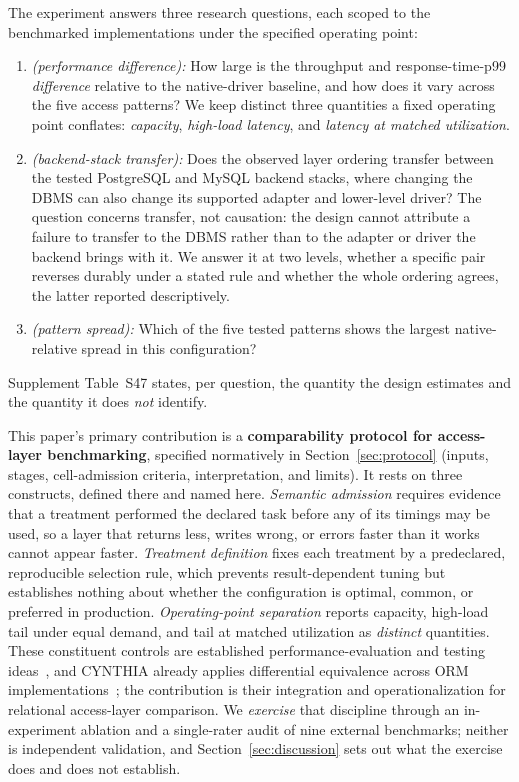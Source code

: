 The experiment answers three research questions, each scoped to the benchmarked
implementations under the specified operating point:
\begin{enumerate}[label=\textbf{RQ\arabic*},leftmargin=*]
  \item \emph{(performance difference):} How large is the throughput and response-time-p99
        \emph{difference} relative to the native-driver baseline, and how does it vary across the
        five access patterns? We keep distinct three quantities a fixed operating point conflates:
        \emph{capacity}, \emph{high-load latency}, and \emph{latency at matched utilization}.
  \item \emph{(backend-stack transfer):} Does the observed layer ordering transfer between the
        tested PostgreSQL and MySQL backend stacks, where changing the DBMS can also change its
        supported adapter and lower-level driver? The question concerns transfer, not causation: the
        design cannot attribute a failure to transfer to the DBMS rather than to the adapter or
        driver the backend brings with it. We answer it at two levels, whether a specific pair
        reverses durably under a stated rule and whether the whole ordering agrees, the latter
        reported descriptively.
  \item \emph{(pattern spread):} Which of the five tested patterns shows the
        largest native-relative spread in this configuration?
\end{enumerate}
Supplement Table~S47 states, per question, the quantity the design estimates and the quantity it
does \emph{not} identify.

This paper's primary contribution is a \textbf{comparability protocol for access-layer
benchmarking}, specified normatively in Section~\ref{sec:protocol} (inputs, stages, cell-admission
criteria, interpretation, and limits).
It rests on three constructs, defined there and named here.
\emph{Semantic admission} requires evidence that a treatment performed the declared task before any
of its timings may be used, so a layer that returns less, writes wrong, or errors faster than it
works cannot appear faster.
\emph{Treatment definition} fixes each treatment by a predeclared, reproducible selection rule,
which prevents result-dependent tuning but establishes nothing about whether the configuration is
optimal, common, or preferred in production.
\emph{Operating-point separation} reports capacity, high-load tail under equal demand, and tail at
matched utilization as \emph{distinct} quantities.
These constituent controls are established performance-evaluation and testing
ideas~\cite{raasveldt2018fair,fruth2022tail,georges2007rigorous}, and CYNTHIA already applies
differential equivalence across ORM implementations~\cite{sotiropoulos2021cynthia}; the contribution
is their integration and operationalization for relational access-layer comparison.
We \emph{exercise} that discipline through an in-experiment ablation and a single-rater audit of
nine external benchmarks; neither is independent validation, and Section~\ref{sec:discussion} sets
out what the exercise does and does not establish.

